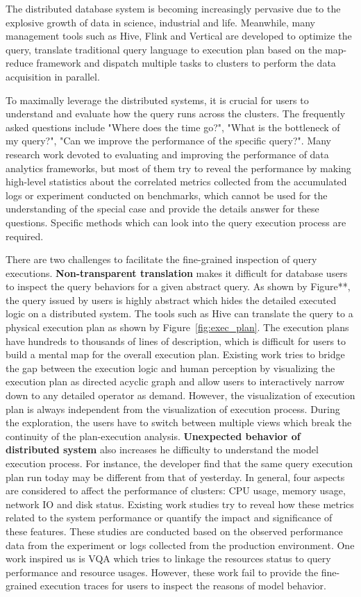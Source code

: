 The distributed database system is becoming increasingly pervasive due to the explosive growth of data in science, industrial and life.
Meanwhile, many management tools such as Hive, Flink and Vertical are developed to optimize the query, translate traditional query language to execution plan based on the map-reduce framework and dispatch multiple tasks to clusters to perform the data acquisition in parallel.

To maximally leverage the distributed systems, it is crucial for users to understand and evaluate how the query runs across the clusters. The frequently asked questions include "Where does the time go?", "What is the bottleneck of my query?", "Can we improve the performance of the specific query?".  Many research work devoted to evaluating and improving the performance of data analytics frameworks, but most of them try to reveal the performance by making high-level statistics about the correlated metrics collected from the accumulated logs or experiment conducted on benchmarks, which cannot be used for the understanding of the special case and provide the details answer for these questions. Specific methods which can look into the query execution process are required.

There are two challenges to facilitate the fine-grained inspection of query executions. 
\textbf{Non-transparent translation} makes it difficult for database users to inspect the query behaviors for a given abstract query. As shown by Figure**, the query issued by users is highly abstract which hides the detailed executed logic on a distributed system. The tools such as Hive can translate the query to a physical execution plan as shown by Figure~\ref{fig:exec_plan}. The execution plans have hundreds to thousands of lines of description, which is difficult for users to build a mental map for the overall execution plan. Existing work tries to bridge the gap between the execution logic and human perception by visualizing the execution plan as directed acyclic graph and allow users to interactively narrow down to any detailed operator as demand. However, the visualization of execution plan is always independent from the visualization of execution process. During the exploration, the users have to switch between multiple views which break the continuity of the plan-execution analysis.
\textbf{Unexpected behavior of distributed system} also increases he difficulty to understand the model execution process. For instance, the developer find that the same query execution plan run today may be different from that of yesterday. In general, four aspects are considered to affect the performance of clusters: CPU usage, memory usage, network IO and disk status. Existing work studies try to reveal how these metrics related to the system performance or quantify the impact and significance of these features. These studies are conducted based on the observed performance data from the experiment or logs collected from the production environment. One work inspired us is VQA which tries to linkage the resources status to query performance and resource usages. However, these work fail to provide the fine-grained execution traces for users to inspect the reasons of model behavior.

